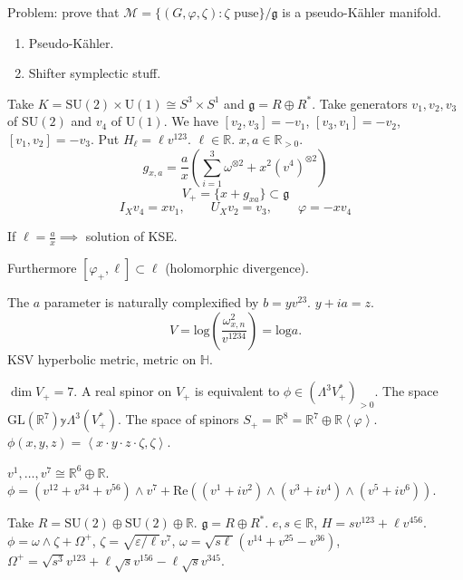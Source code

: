 Problem: prove that 
$\mathcal{M}=\{(G,\varphi,\zeta):\zeta\text{ puse}\}/\mathfrak{g}$
is a pseudo-Kähler manifold.

\begin{enumerate}
\item Pseudo-Kähler.
\item Shifter symplectic stuff.
\end{enumerate}

\begin{example}
\label{example-SU2xSU1}
Take $K=\text{SU}(2)\times\text{U}(1)\cong S^3\times S^1$
and $\mathfrak{g}=R \oplus R^*$.
Take generators $v_1,v_2,v_3$ of $\text{SU}(2)$ and $v_4$ of $\text{U}(1)$.
We have $[v_2,v_3]=-v_1$, $[v_3,v_1]=-v_2$, $[v_1,v_2]=-v_3$.
Put $H_\ell=\ell v^{123}$. $\ell \in \mathbb{R}$. $x,a \in \mathbb{R}_{>0}$.
$$
g_{x,a}=\frac{a}{x}\left(\sum_{i=1}^3\omega^{\otimes 2}
+x^2 (v^4)^{\otimes 2}\right)
$$
$$
V_+=\{ x+g_{xa}\}\subset \mathfrak{g}
$$
$$
I_X v_4=xv_1,\qquad U_X v_2=v_3, \qquad \varphi=-xv_4
$$
\end{example}

\begin{exercise}
\label{exercise-solution-of-KSE}
If $\ell=\frac{a}{x} \implies $ solution of KSE.
\end{exercise}

Furthermore $[\varphi_+,\ell] \subset \ell$
(holomorphic divergence).

The $a$ parameter is naturally complexified by  $b=yv^{23}$.
$y+ia=z$. 
$$
V=\text{log} \left(\frac{\omega^2_{x,n}}{v^{1234}}\right)=\text{log}a.
$$
KSV hyperbolic metric, metric on $\mathbb{H}$.

\medskip\noindent
{\bf $\dim V_+=7$}.
A real spinor on $V_+$ is equivalent to $\phi \in (\Lambda^{3}V_+^* )_{>0}$.
The space $\text{GL}(\mathbb{R}^7)\mathbb{y}\Lambda^{3}(V_+^*)$.
The space of spinors $S_+=\mathbb{R}^8
=\mathbb{R}^7\oplus\mathbb{R}\left<\varphi\right>$.
$\phi(x,y,z)=\left<x\cdot y\cdot z\cdot \zeta,\zeta\right>$.

\begin{remark}
\label{remark-7}
$v^1,\ldots,v^7 \cong \mathbb{R}^6 \oplus \mathbb{R}$.
$\phi=(v^{12}+v^{34}+v^{56})\wedge v^7+
\text{Re}((v^1+i v^2)\wedge(v^3+iv^4)\wedge(v^5+iv^6))$.
\end{remark}

\begin{example}
\label{example-SU2+SU2+R}
Take $R=\text{SU}(2)\oplus \text{SU}(2)\oplus \mathbb{R}$.
$\mathfrak{g}=R \oplus R^*$.
$e,s \in \mathbb{R}$, $H=sv^{123}+\ell v^{456}$.
$\phi=\omega \wedge \zeta+\Omega^+$,
$\zeta=\sqrt{\varepsilon/\ell}v^7$,
$\omega=\sqrt{s\ell}(v^{14}+v^{25}-v^{36})$,
$\Omega^+=\sqrt{s^3}v^{123}+\ell \sqrt{s}v^{156}-\ell \sqrt{s}v^{345}$.
\end{example}

